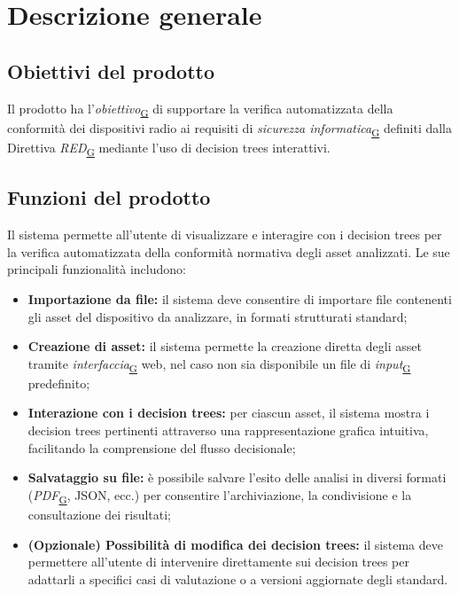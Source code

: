 ﻿\documentclass[a4paper,12pt]{article}
\begin{document}
\newpage

\section{Descrizione generale}{
  \subsection{Obiettivi del prodotto}{
      Il prodotto ha l'\textit{obiettivo}\textsubscript{\href{https://atlasteam9.github.io/Atlas/glossario.html\#Obiettivo}{G}} di supportare la verifica automatizzata della conformità dei dispositivi radio ai requisiti di \textit{sicurezza informatica}\textsubscript{\href{https://atlasteam9.github.io/Atlas/glossario.html\#Sicurezzainformatica}{G}} definiti dalla Direttiva \textit{RED}\textsubscript{\href{https://atlasteam9.github.io/Atlas/glossario.html\#RED}{G}} mediante l'uso di decision trees interattivi.
  }

  \subsection{Funzioni del prodotto}{
      Il sistema permette all'utente di visualizzare e interagire con i decision trees per la verifica automatizzata della conformità normativa degli asset analizzati.
      \newline
      Le sue principali funzionalità includono:
      \begin{itemize}
          \item \textbf{Importazione da file:} il sistema deve consentire di importare file contenenti gli asset del dispositivo da analizzare, in formati strutturati standard;
          \item \textbf{Creazione di asset:} il sistema permette la creazione diretta degli asset tramite \textit{interfaccia}\textsubscript{\href{https://atlasteam9.github.io/Atlas/glossario.html\#Interfaccia}{G}} web, nel caso non sia disponibile un file di \textit{input}\textsubscript{\href{https://atlasteam9.github.io/Atlas/glossario.html\#Input}{G}} predefinito;
          \item \textbf{Interazione con i decision trees:} per ciascun asset, il sistema mostra i decision trees pertinenti attraverso una rappresentazione grafica intuitiva, facilitando la comprensione del flusso decisionale;
          \item \textbf{Salvataggio su file:} è possibile salvare l'esito delle analisi in diversi formati (\textit{PDF}\textsubscript{\href{https://atlasteam9.github.io/Atlas/glossario.html\#PDF}{G}}, JSON, ecc.) per consentire l'archiviazione, la condivisione e la consultazione dei risultati;
          \item \textbf{(Opzionale) Possibilità di modifica dei decision trees:} il sistema deve permettere all'utente di intervenire direttamente sui decision trees per adattarli a specifici casi di valutazione o a versioni aggiornate degli standard.
      \end{itemize}
  }

}
\end{document}

